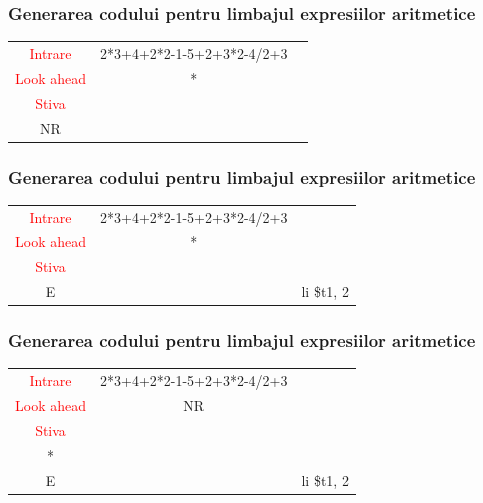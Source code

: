 \documentclass[pdf]{beamer}
\begin{document}
\begin{frame}
\frametitle{Generarea codului pentru limbajul expresiilor aritmetice}
\begin{center}
\begin{tabular}{cc|c|} \cline{1-2}
\multicolumn{1}{|c|}{\textcolor{red}{Intrare}} & {2*3+4+2*2-1-5+2+3*2-4/2+3} \\ \cline{1-2}
\multicolumn{1}{|c|}{\textcolor{red}{Look ahead}} & * \\ \cline{1-2}
\multicolumn{1}{|c|}{\textcolor{red}{Stiva}}  \\
\cline{1-1} \cline{3-3}
\multicolumn{1}{|c|}{NR} & & \textit{\quad}\\
\cline{1-1} \cline{3-3}
\end{tabular}
\end{center}
\end{frame}



\begin{frame}
\frametitle{Generarea codului pentru limbajul expresiilor aritmetice}
\begin{center}
\begin{tabular}{cc|c|} \cline{1-2}
\multicolumn{1}{|c|}{\textcolor{red}{Intrare}} & {2*3+4+2*2-1-5+2+3*2-4/2+3} \\ \cline{1-2}
\multicolumn{1}{|c|}{\textcolor{red}{Look ahead}} & * \\ \cline{1-2}
\multicolumn{1}{|c|}{\textcolor{red}{Stiva}}  \\
\cline{1-1} \cline{3-3}
\multicolumn{1}{|c|}{E} & & {li \quad \$t1, 2}\\
\cline{1-1} \cline{3-3}
\end{tabular}
\end{center}
\end{frame}



\begin{frame}
\frametitle{Generarea codului pentru limbajul expresiilor aritmetice}
\begin{center}
\begin{tabular}{cc|c|} \cline{1-2}
\multicolumn{1}{|c|}{\textcolor{red}{Intrare}} & {2*3+4+2*2-1-5+2+3*2-4/2+3} \\ \cline{1-2}
\multicolumn{1}{|c|}{\textcolor{red}{Look ahead}} & NR \\ \cline{1-2}
\multicolumn{1}{|c|}{\textcolor{red}{Stiva}}  \\
\cline{1-1} \cline{3-3}
\multicolumn{1}{|c|}{*} & & {}\\
\cline{1-1} \cline{3-3} 
\multicolumn{1}{|c|}{E} & & {li \quad \$t1, 2}\\
\cline{1-1} \cline{3-3}
\end{tabular}
\end{center}
\end{frame}
\end{document}
